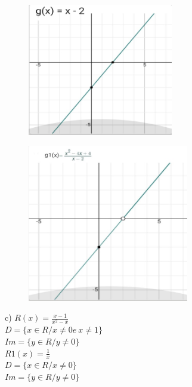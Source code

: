 \begin{respostas}{3}
	\begin{figure}[H]
		\begin{Center}
			\includegraphics[width=2.5in,height=2.27in]{capitulos/outras_funcoes/media/image47.jpeg}
		\end{Center}
	\end{figure}

	\begin{figure}[H]
		\begin{Center}
			\includegraphics[width=2.77in,height=2.7in]{capitulos/outras_funcoes/media/image48.jpeg}
		\end{Center}
	\end{figure}

	c) \( R \left( x \right) =\frac{x-1}{x^{2}-x}\) \\ \(D= \{ x \in R/x \neq 0 e~x \neq 1 \}  \) \\ \( Im= \{ y \in R/y \neq 0 \} \)\\

	\( R1 \left( x \right) =\frac{1}{x}\) \\\(D= \{ x \in R/x \neq 0 \}  \) \\ \( Im= \{ y \in R/y \neq 0 \}  \)


\end{respostas}
